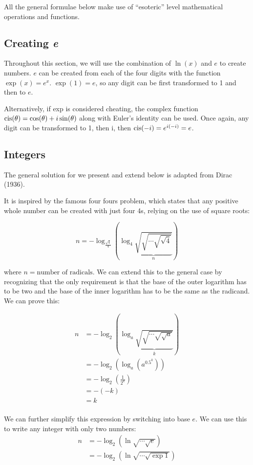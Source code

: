 All the general formulae below make use of ``esoteric'' level mathematical operations and functions.

\subsection{Creating \emph{e}}
Throughout this section, we will use the combination of $\ln(x)$ and $e$ to create numbers.
$e$ can be created from each of the four digits with the function $\exp(x)=e^x$.
$\exp(1)=e$, so any digit can be first transformed to 1 and then to $e$.

Alternatively, if exp is considered cheating, the complex function $\operatorname{cis}(\theta)=\cos(\theta)+i\sin(\theta)$ along with Euler's identity can be used. 
Once again, any digit can be transformed to 1, then i, then $\operatorname{cis}(-i)=e^{i(-i)}=e$.

\subsection{Integers}

The general solution for we present and extend below is adapted from Dirac (1936).

It is inspired by the famous four fours problem, which states that any positive whole number can be created with just four 4s, relying on the use of square roots:

\begin{equation}
  n = -\log_\frac{\sqrt{4}}{4}\left( \log_4 \underbrace{\sqrt{\sqrt{\cdots\sqrt{\sqrt{4}}}}}_{n} \right)
\end{equation}

where $n=\textrm{number of radicals}$.
We can extend this to the general case by recognizing that the only requirement is that the base of the outer logarithm has to be two and the base of the inner logarithm has to be the same as the radicand.
We can prove this:

\begin{align*}
  n &= -\log_2\left(\log_a \underbrace{\sqrt{\sqrt{\cdots\sqrt{\sqrt{a}}}}}_{k} \right) \\
  &= -\log_2\left(\log_a \left(a^{0.5^k}\right)\right) \\
  &= -\log_2\left(\frac{1}{2^k}\right) \\
  &= -(-k) \\
  &= k \\
\end{align*}

We can further simplify this expression by switching into base $e$.
We can use this to write any integer with only two numbers:
\begin{align*}
  n &= -\log_2\left( \ln \sqrt{\cdots\sqrt{e}}\right) \\
  &= -\log_2\left( \ln \sqrt{\cdots\sqrt{\exp1}}\right)
\end{align*}


